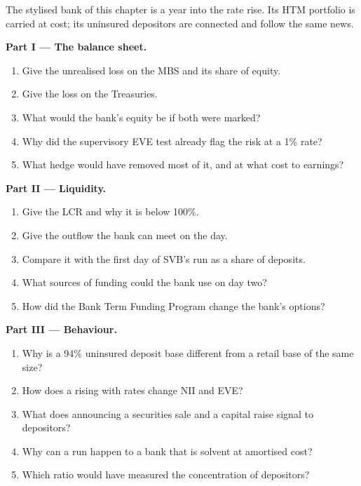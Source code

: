 \begin{problem}\label{pb:rc:liquidity-and-funding-risk-bank-treasury:1}
The stylised bank of this chapter is a year into the rate rise. Its HTM portfolio is carried at cost;
its uninsured depositors are connected and follow the same news.

\medskip\noindent\textbf{Part I --- The balance sheet.}
\begin{enumerate}
\item Give the unrealised loss on the MBS and its share of equity.
\item Give the loss on the Treasuries.
\item What would the bank's equity be if both were marked?
\item Why did the supervisory EVE test already flag the risk at a 1\% rate?
\item What hedge would have removed most of it, and at what cost to earnings?
\end{enumerate}

\medskip\noindent\textbf{Part II --- Liquidity.}
\begin{enumerate}[resume]
\item Give the LCR and why it is below 100\%.
\item Give the outflow the bank can meet on the day.
\item Compare it with the first day of SVB's run as a share of deposits.
\item What sources of funding could the bank use on day two?
\item How did the Bank Term Funding Program change the bank's options?
\end{enumerate}

\medskip\noindent\textbf{Part III --- Behaviour.}
\begin{enumerate}[resume]
\item Why is a 94\% uninsured deposit base different from a retail base of the same size?
\item How does a  rising with rates change NII and EVE?
\item What does announcing a securities sale and a capital raise signal to depositors?
\item Why can a run happen to a bank that is solvent at amortised cost?
\item Which ratio would have measured the concentration of depositors?
\end{enumerate}


\end{problem}
